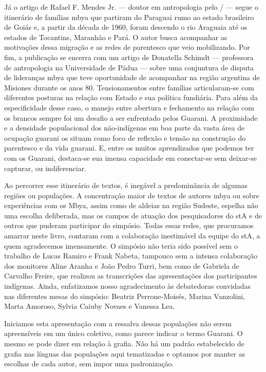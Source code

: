Já o artigo de Rafael F. Mendes Jr. — doutor em antropologia pelo
/ — segue o itinerário de famílias mbya que partiram do Paraguai
rumo ao estado brasileiro de Goiás e, a partir da década de 1960, foram
descendo o rio Araguaia até os estados de Tocantins, Maranhão e Pará. O
autor busca acompanhar as motivações dessa migração e as redes de
parentesco que veio mobilizando. Por fim, a publicação se encerra com
um artigo de Donatella Schimdt — professora de antropologia na
Universidade de Pádua — sobre uma conjuntura de disputa de lideranças
mbya que teve oportunidade de acompanhar na região argentina de
Misiones durante os anos 80. Tensionamentos entre famílias
articularam-se com diferentes posturas na relação com Estado e sua
política fundiária. Para além da especificidade desse caso, o manejo
entre abertura e fechamento na relação com os brancos sempre foi um
desafio a ser enfrentado pelos Guarani. A proximidade e a densidade
populacional dos não-indígenas em boa parte da vasta área de ocupação
guarani os situam como foco de reflexão e tensão na construção do
parentesco e da vida guarani. E, entre os muitos aprendizados que
podemos ter com os Guarani, destaca-se sua imensa capacidade em
conectar-se sem deixar-se capturar, ou indiferenciar.

Ao percorrer esse itinerário de textos, é inegável a predominância de
algumas regiões ou populações. A concentração maior de textos de
autores mbya ou sobre experiências com os Mbya, assim como de aldeias
na região Sudeste, espelha não uma escolha deliberada, mas os campos de
atuação dos pesquisadores do stA e de outros que puderam participar
do simpósio. Todas essas redes, que procuramos amarrar neste livro,
contaram com a colaboração inestimável da equipe do stA, a quem
agradecemos imensamente. O simpósio não teria sido possível sem o
trabalho de Lucas Ramiro e Frank Nabeta, tampouco sem a intensa
colaboração dos monitores Aline Aranha e João Pedro Turri, bem como de
Gabriela de Carvalho Freire, que realizou as transcrições das
apresentações dos participantes indígenas. Ainda, enfatizamos nosso
agradecimento às debatedoras convidadas nas diferentes mesas do
simpósio: Beatriz Perrone-Moisés, Marina Vanzolini, Marta Amoroso,
Sylvia Caiuby Novaes e Vanessa Lea.

Iniciamos esta apresentação com a ressalva dessas populações não serem
apreensíveis em um único coletivo, como parece indicar o termo Guarani.
O mesmo se pode dizer em relação à grafia. Não há um padrão
estabelecido de grafia nas línguas das populações aqui tematizadas e
optamos por manter as escolhas de cada autor, sem impor uma
padronização. 

